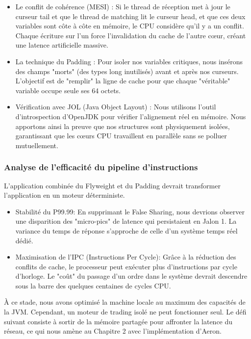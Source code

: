 \begin{itemize}
    \item Le conflit de cohérence (MESI) : Si le thread de réception met à jour le curseur tail et que le thread de matching lit le curseur head, et que ces deux variables sont côte à côte en mémoire, le CPU considère qu'il y a un conflit. Chaque écriture sur l'un force l'invalidation du cache de l'autre cœur, créant une latence artificielle massive.
    \item La technique du Padding : Pour isoler nos variables critiques, nous insérons des champs "morts" (des types long inutilisés) avant et après nos curseurs. L'objectif est de "remplir" la ligne de cache pour que chaque "véritable" variable occupe seule ses 64 octets.
    \item Vérification avec JOL (Java Object Layout) : Nous utilisons l'outil d'introspection d'OpenJDK pour vérifier l'alignement réel en mémoire. Nous apportons ainsi la preuve que nos structures sont physiquement isolées, garantissant que les cœurs CPU travaillent en parallèle sans se polluer mutuellement.
\end{itemize}

\subsubsection{Analyse de l'efficacité du pipeline d'instructions}

L'application combinée du Flyweight et du Padding devrait transformer l'application en un moteur déterministe.

\begin{itemize}
    \item Stabilité du P99.99: En supprimant le False Sharing, nous devrions observer une disparition des "micro-pics" de latence qui persistaient en Jalon 1. La variance du temps de réponse s'approche de celle d'un système temps réel dédié.
    \item Maximisation de l'IPC (Instructions Per Cycle): Grâce à la réduction des conflits de cache, le processeur peut exécuter plus d'instructions par cycle d'horloge. Le "coût" du passage d'un ordre dans le système devrait descendre sous la barre des quelques centaines de cycles CPU.
\end{itemize}

À ce stade, nous avons optimisé la machine locale au maximum des capacités de la JVM. Cependant, un moteur de trading isolé ne peut fonctionner seul. Le défi suivant consiste à sortir de la mémoire partagée pour affronter la latence du réseau, ce qui nous amène au Chapitre 2 avec l'implémentation d'Aeron.